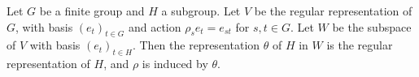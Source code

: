 Let $G$ be a finite group and $H$ a subgroup. Let $V$ be the regular representation of $G$, with basis $(e_t)_{t \in G}$ and action $\rho_s e_t = e_{st}$ for $s, t \in G$. Let $W$ be the subspace of $V$ with basis $(e_t)_{t \in H}$. Then the representation $\theta$ of $H$ in $W$ is the regular representation of $H$, and $\rho$ is induced by $\theta$.

